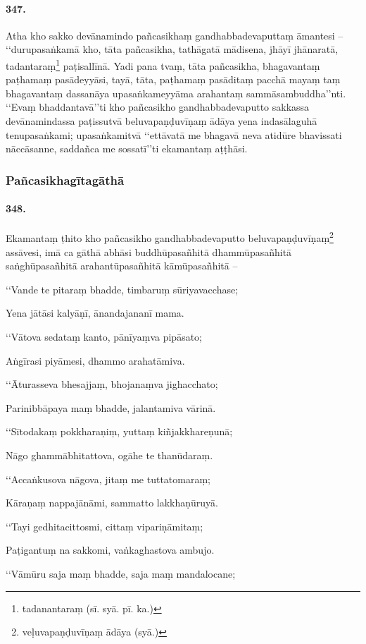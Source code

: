 \paragraph{347.} Atha kho sakko devānamindo pañcasikhaṃ gandhabbadevaputtaṃ āmantesi – ‘‘durupasaṅkamā kho, tāta pañcasikha, tathāgatā mādisena, jhāyī jhānaratā, tadantaraṃ\footnote{tadanantaraṃ (sī. syā. pī. ka.)} paṭisallīnā. Yadi pana tvaṃ, tāta pañcasikha, bhagavantaṃ paṭhamaṃ pasādeyyāsi, tayā, tāta, paṭhamaṃ pasāditaṃ pacchā mayaṃ taṃ bhagavantaṃ dassanāya upasaṅkameyyāma arahantaṃ sammāsambuddha’’nti. ‘‘Evaṃ bhaddantavā’’ti kho pañcasikho gandhabbadevaputto sakkassa devānamindassa paṭissutvā beluvapaṇḍuvīṇaṃ ādāya yena indasālaguhā tenupasaṅkami; upasaṅkamitvā ‘‘ettāvatā me bhagavā neva atidūre bhavissati nāccāsanne, saddañca me sossatī’’ti ekamantaṃ aṭṭhāsi.

\subsubsection{Pañcasikhagītagāthā}

\paragraph{348.} Ekamantaṃ ṭhito kho pañcasikho gandhabbadevaputto beluvapaṇḍuvīṇaṃ\footnote{veḷuvapaṇḍuvīṇaṃ ādāya (syā.)} assāvesi, imā ca gāthā abhāsi buddhūpasañhitā dhammūpasañhitā saṅghūpasañhitā arahantūpasañhitā kāmūpasañhitā –

‘‘Vande te pitaraṃ bhadde, timbaruṃ sūriyavacchase;

Yena jātāsi kalyāṇī, ānandajananī mama.

‘‘Vātova sedataṃ kanto, pānīyaṃva pipāsato;

Aṅgīrasi piyāmesi, dhammo arahatāmiva.

‘‘Āturasseva bhesajjaṃ, bhojanaṃva jighacchato;

Parinibbāpaya maṃ bhadde, jalantamiva vārinā.

‘‘Sītodakaṃ pokkharaṇiṃ, yuttaṃ kiñjakkhareṇunā;

Nāgo ghammābhitattova, ogāhe te thanūdaraṃ.

‘‘Accaṅkusova nāgova, jitaṃ me tuttatomaraṃ;

Kāraṇaṃ nappajānāmi, sammatto lakkhaṇūruyā.

‘‘Tayi gedhitacittosmi, cittaṃ vipariṇāmitaṃ;

Paṭigantuṃ na sakkomi, vaṅkaghastova ambujo.

‘‘Vāmūru saja maṃ bhadde, saja maṃ mandalocane;

